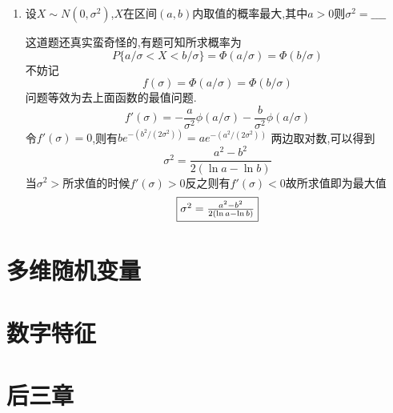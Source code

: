 \documentclass[12pt, a4paper, oneside, UTF8]{ctexbook}
\begin{document}
\begin{enumerate}
    \item 设$X\sim N(0,\sigma^2)$,$X$在区间$(a,b)$内取值的概率最大,其中$a>0$则$\sigma^2=\_\_\_\_$
    
    \begin{solution}
        这道题还真实蛮奇怪的,有题可知所求概率为
        $$P\{a/\sigma < X < b/\sigma\}=\Phi(a/\sigma)=\Phi(b/\sigma)$$
        不妨记
        \[
        f(\sigma)=\Phi(a/\sigma)=\Phi(b/\sigma)
        \]
        问题等效为去上面函数的最值问题. 
        \[
            f'(\sigma) = -\frac{a}{\sigma^2}\phi(a/\sigma)-\frac{b}{\sigma^2}\phi(a/\sigma)
        \]
        令$f'(\sigma)=0$,则有$be^{-(b^2/(2\sigma^2))}=ae^{-(a^2/(2\sigma^2))}$
        两边取对数,可以得到 
        \[
        \sigma^2=\frac{a^2-b^2}{2(\ln{a}-\ln{b})}
        \]
        当$\sigma^2>$所求值的时候$f'(\sigma)>0$反之则有$f'(\sigma)<0$故所求值即为最大值 
        \[
        \fbox{$\sigma^2=\frac{a^2-b^2}{2(\ln{a}-\ln{b})}$}
        \]
    \end{solution}
\end{enumerate}


\section{多维随机变量}

\section{数字特征}

\section{后三章}

\ifx\allfiles\undefined
\end{document}
